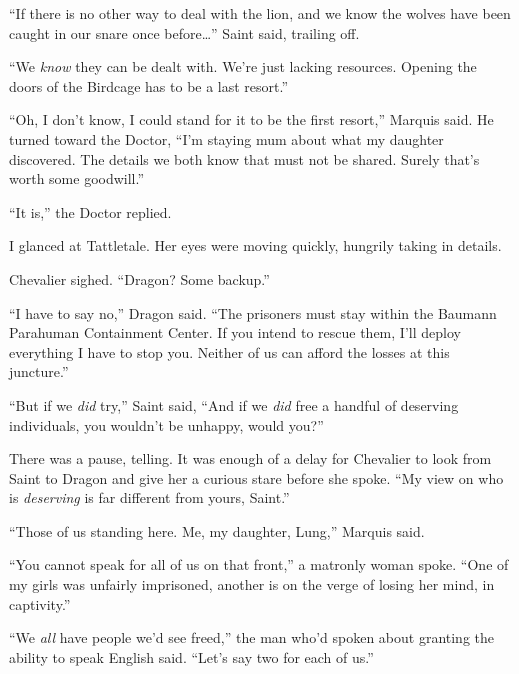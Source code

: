 ``If there is no other way to deal with the lion, and we know the wolves have been caught in our snare once before\ldots'' Saint said, trailing off.



``We \emph{know} they can be dealt with.  We're just lacking resources.  Opening the doors of the Birdcage has to be a last resort.''



``Oh, I don't know, I could stand for it to be the first resort,'' Marquis said.  He turned toward the Doctor, ``I'm staying mum about what my daughter discovered.  The details we both know that must not be shared.  Surely that's worth some goodwill.''



``It is,'' the Doctor replied.



I glanced at Tattletale.  Her eyes were moving quickly, hungrily taking in details.



Chevalier sighed.  ``Dragon?  Some backup.''



``I have to say no,'' Dragon said.  ``The prisoners must stay within the Baumann Parahuman Containment Center.  If you intend to rescue them, I'll deploy everything I have to stop you.  Neither of us can afford the losses at this juncture.''



``But if we \emph{did} try,'' Saint said, ``And if we \emph{did} free a handful of deserving individuals, you wouldn't be unhappy, would you?''



There was a pause, telling.  It was enough of a delay for Chevalier to look from Saint to Dragon and give her a curious stare before she spoke.  ``My view on who is \emph{deserving} is far different from yours, Saint.''



``Those of us standing here.  Me, my daughter, Lung,'' Marquis said.



``You cannot speak for all of us on that front,'' a matronly woman spoke.  ``One of my girls was unfairly imprisoned, another is on the verge of losing her mind, in captivity.''



``We \emph{all} have people we'd see freed,'' the man who'd spoken about granting the ability to speak English said.  ``Let's say two for each of us.''



